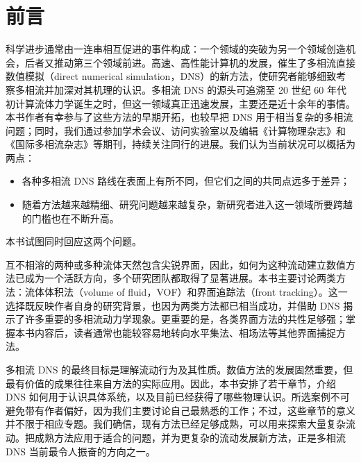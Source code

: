 \documentclass[11pt,a4paper,openany,fontset=none]{ctexbook}
\begin{document}
\clearpage
\makeatletter\@mainmattertrue\makeatother
{}


\chapter*{前言}

科学进步通常由一连串相互促进的事件构成：一个领域的突破为另一个领域创造机会，后者又推动第三个领域前进。高速、高性能计算机的发展，催生了多相流直接数值模拟（direct numerical simulation，DNS）的新方法，使研究者能够细致考察多相流并加深对其机理的认识。多相流 DNS 的源头可追溯至 20 世纪 60 年代初计算流体力学诞生之时，但这一领域真正迅速发展，主要还是近十余年的事情。本书作者有幸参与了这些方法的早期开拓，也较早把 DNS 用于相当复杂的多相流问题；同时，我们通过参加学术会议、访问实验室以及编辑《计算物理杂志》和《国际多相流杂志》等期刊，持续关注同行的进展。我们认为当前状况可以概括为两点：

\begin{itemize}
  \item 各种多相流 DNS 路线在表面上有所不同，但它们之间的共同点远多于差异；
  \item 随着方法越来越精细、研究问题越来越复杂，新研究者进入这一领域所要跨越的门槛也在不断升高。
\end{itemize}

本书试图同时回应这两个问题。

互不相溶的两种或多种流体天然包含尖锐界面，因此，如何为这种流动建立数值方法已成为一个活跃方向，多个研究团队都取得了显著进展。本书主要讨论两类方法：流体体积法（volume of fluid，VOF）和界面追踪法（front tracking）。这一选择既反映作者自身的研究背景，也因为两类方法都已相当成功，并借助 DNS 揭示了许多重要的多相流动力学现象。更重要的是，各类界面方法的共性足够强；掌握本书内容后，读者通常也能较容易地转向水平集法、相场法等其他界面捕捉方法。

多相流 DNS 的最终目标是理解流动行为及其性质。数值方法的发展固然重要，但最有价值的成果往往来自方法的实际应用。因此，本书安排了若干章节，介绍 DNS 如何用于认识具体系统，以及目前已经获得了哪些物理认识。所选案例不可避免带有作者偏好，因为我们主要讨论自己最熟悉的工作；不过，这些章节的意义并不限于相应专题。我们确信，现有方法已经足够成熟，可以用来探索大量复杂流动。把成熟方法应用于适合的问题，并为更复杂的流动发展新方法，正是多相流 DNS 当前最令人振奋的方向之一。
\end{document}
